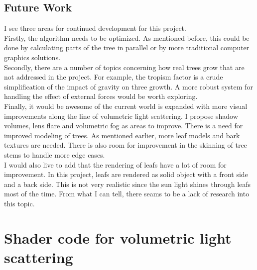 \documentclass{article}
\begin{document}
  		\subsection{Future Work}
  		
  			I see three areas for continued development for this project.\\
  			
  			Firstly, the algorithm needs to be optimized. As mentioned before, this could be done by calculating parts of the tree in parallel or by more traditional computer graphics solutions. \\
  			
  			Secondly, there are a number of topics concerning how real trees grow that are not addressed in the project. For example, the tropism factor is a crude simplification of the impact of gravity on three growth. A more robust system for handling the effect of external forces would be worth exploring.  \\
  			
  			Finally, it would be awesome of the current world is expanded with more visual improvements along the line of volumetric light scattering. I propose shadow volumes, lens flare and volumetric fog as areas to improve. There is a need for improved modeling of trees. As mentioned earlier, more leaf models and bark textures are needed. There is also room for improvement in the skinning of tree stems to handle more edge cases. \\
  	
  			I would also live to add that the rendering of leafs have a lot of room for improvement. In this project, leafs are rendered as solid object with a front side and a back side. This is not very realistic since the sun light shines through leafs most of the time. From what I can tell, there seams to be a lack of research into this topic.

	\newpage
	
	{}
	
	\newpage
	\appendix
	\section{Shader code for volumetric light scattering}
	\label{appendix:godray}
		
\end{document}
